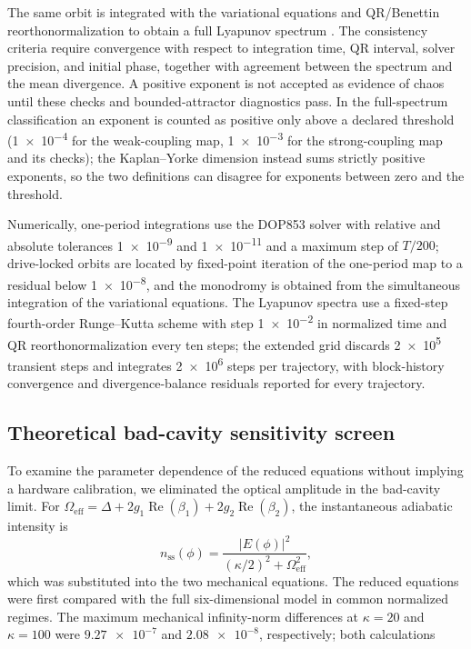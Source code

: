 \documentclass[aip,cha,reprint]{revtex4-2}
\begin{document}
The same orbit is integrated with the variational equations and QR/Benettin
reorthonormalization to obtain a full Lyapunov spectrum
\cite{benettin1980,wolf1985,eckmann1985}. The consistency criteria
require convergence with respect to integration time, QR interval, solver
precision, and initial phase, together with agreement between the spectrum and the
mean divergence. A positive exponent is not accepted as evidence of chaos until
these checks and bounded-attractor diagnostics pass. In the full-spectrum
classification an exponent is counted as positive only above a declared threshold
(\num{1e-4} for the weak-coupling map, \num{1e-3} for the strong-coupling map and its checks); the Kaplan--Yorke dimension instead sums strictly positive exponents,
so the two definitions can disagree for exponents between zero and the threshold.

Numerically, one-period integrations use the DOP853 solver with relative and
absolute tolerances \num{1e-9} and \num{1e-11} and a maximum step of $T/200$;
drive-locked orbits are located by fixed-point iteration of the one-period map to
a residual below \num{1e-8}, and the monodromy is obtained from the simultaneous
integration of the variational equations. The Lyapunov spectra use a fixed-step
fourth-order Runge--Kutta scheme with step \num{1e-2} in normalized time and QR
reorthonormalization every ten steps; the extended grid discards \num{2e5}
transient steps and integrates \num{2e6} steps per trajectory, with block-history
convergence and divergence-balance residuals reported for every trajectory.

\subsection{Theoretical bad-cavity sensitivity screen}

To examine the parameter dependence of the reduced equations without implying a
hardware calibration, we eliminated the optical amplitude in the bad-cavity limit.
For $\Omega_{\mathrm{eff}}=\Delta+2g_1\operatorname{Re}(\beta_1)+
2g_2\operatorname{Re}(\beta_2)$, the instantaneous adiabatic intensity is
\begin{equation}
 n_{\mathrm{ss}}(\phi)=
 \frac{|E(\phi)|^2}{(\kappa/2)^2+\Omega_{\mathrm{eff}}^2},
\label{eq:adiabatic-intensity}
\end{equation}
which was substituted into the two mechanical equations. The reduced equations were
first compared with the full six-dimensional model in common normalized regimes. The maximum mechanical infinity-norm differences at $\kappa=20$ and $\kappa=100$ were
$\num{9.27e-7}$ and $\num{2.08e-8}$, respectively; both calculations
\end{document}
